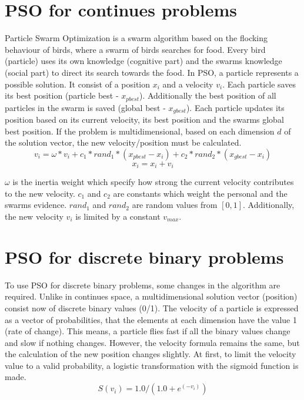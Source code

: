 \documentclass{article}
\begin{document}
\section{PSO for continues problems}
\label{lbl-pso-cont}
Particle Swarm Optimization is a swarm algorithm based on the flocking behaviour of birds, where a swarm of birds searches for food. Every bird (particle) uses its own knowledge (cognitive part) and the swarms knowledge (social part) to direct its search towards the food. In PSO, a particle represents a possible solution. It consist of a position $x_i$ and a velocity $v_i$. Each particle saves its best position (particle best - $x_{pbest}$). Additionally the best position of all particles in the swarm is saved (global best - $x_{gbest}$). Each particle updates its position based on its current velocity, its best position and the swarms global best position. If the problem is multidimensional, based on each dimension $d$ of the solution vector, the new velocity/position must be calculated.
\begin{equation}
\label{formula-1}
v_i = \omega * v_i + c_1 * rand_1 * (x_{pbest} - x_i) + c_2 * rand_2 * (x_{gbest} - x_i)
\end{equation}
\begin{equation}
\label{formula-2}
x_i = x_i + v_i
\end{equation}

$\omega$ is the inertia weight which specify how strong the current velocity contributes to the new velocity. $c_1$ and $c_2$ are constants which weight the personal and the swarms evidence. $rand_1$ and $rand_2$ are random values from $[0,1]$. Additionally, the new velocity $v_i$ is limited by a constant $v_{max}$.

\section{PSO for discrete binary problems}
\label{lbl-pso-disc}
To use PSO for discrete binary problems, some changes in the algorithm are required. Unlike in continues space, a multidimensional solution vector (position) consist now of discrete binary values (0/1). The velocity of a particle is expressed as a vector of probabilities, that the elements at each dimension have the value 1 (rate of change). This means, a particle flies fast if all the binary values change and slow if nothing changes. However, the velocity formula remains the same, but the calculation of the new position changes slightly. At first, to limit the velocity value to a valid probability, a logistic transformation with the sigmoid function is made.
\begin{equation}
\label{formula-3}
S(v_i) = 1.0 / (1.0 + e^{(-v_i)})
\end{equation}
\end{document}
